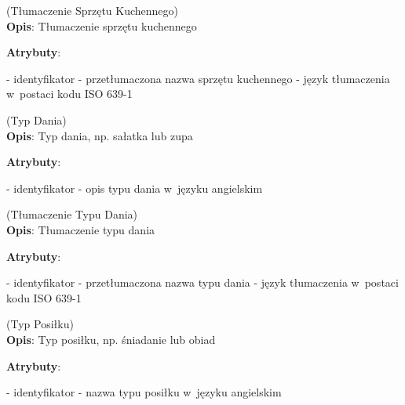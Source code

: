 \begin{enumerate}[label={\textbf{KAT/3/\protect\twodigits{\theenumi}}}, wide, labelwidth=!, labelindent=0pt, labelsep=0pt, series=reqs]
    \label{kat:KitchenApplianceTranslation} (Tłumaczenie Sprzętu Kuchennego)\\
    \indent\textbf{Opis}: Tłumaczenie sprzętu kuchennego
    \par
    \textbf{Atrybuty}:
    \begin{itemize}[series=atr, wide, align=left, leftmargin=190pt]
        \label{kat:KitchenApplianceTranslation:id}- identyfikator
        \label{kat:KitchenApplianceTranslation:translation}- przetłumaczona nazwa sprzętu kuchennego
        \label{kat:KitchenApplianceTranslation:language}- język tłumaczenia w~postaci kodu ISO 639-1
    \end{itemize}

    \label{kat:DishType} (Typ Dania)\\
    \indent\textbf{Opis}: Typ dania, np. sałatka lub zupa
    \par
    \textbf{Atrybuty}:
    \begin{itemize}[series=atr, wide, align=left, leftmargin=190pt]
        \label{kat:DishType:id}- identyfikator
        \label{kat:DishType:description}- opis typu dania w~języku angielskim
    \end{itemize}

    \label{kat:DishTypeTranslation} (Tłumaczenie Typu Dania)\\
    \indent\textbf{Opis}: Tłumaczenie typu dania
    \par
    \textbf{Atrybuty}:
    \begin{itemize}[series=atr, wide, align=left, leftmargin=190pt]
        \label{kat:DishTypeTranslation:id}- identyfikator
        \label{kat:DishTypeTranslation:translation}- przetłumaczona nazwa typu dania
        \label{kat:DishTypeTranslation:language}- język tłumaczenia w~postaci kodu ISO 639-1
    \end{itemize}

    \label{kat:MealType} (Typ Posiłku)\\
    \indent\textbf{Opis}: Typ posiłku, np. śniadanie lub obiad
    \par
    \textbf{Atrybuty}:
    \begin{itemize}[series=atr, wide, align=left, leftmargin=190pt]
        \label{kat:MealType:id}- identyfikator
        \label{kat:MealType:name}- nazwa typu posiłku w~języku angielskim
    \end{itemize}


\end{enumerate}
